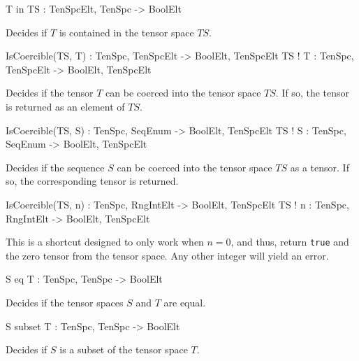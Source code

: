 \begin{intrinsics}
T in TS : TenSpcElt, TenSpc -> BoolElt
\end{intrinsics}

Decides if $T$ is contained in the tensor space $TS$.

\begin{intrinsics}
IsCoercible(TS, T) : TenSpc, TenSpcElt -> BoolElt, TenSpcElt
TS ! T : TenSpc, TenSpcElt -> BoolElt, TenSpcElt
\end{intrinsics}

Decides if the tensor $T$ can be coerced into the tensor space $TS$. If so, the tensor is returned as an element of $TS$.

\begin{intrinsics}
IsCoercible(TS, S) : TenSpc, SeqEnum -> BoolElt, TenSpcElt
TS ! S : TenSpc, SeqEnum -> BoolElt, TenSpcElt
\end{intrinsics}

Decides if the sequence $S$ can be coerced into the tensor space $TS$ as a tensor. If so, the corresponding tensor is returned. 

\begin{intrinsics}
IsCoercible(TS, n) : TenSpc, RngIntElt -> BoolElt, TenSpcElt
TS ! n : TenSpc, RngIntElt -> BoolElt, TenSpcElt
\end{intrinsics}

This is a shortcut designed to only work when $n=0$, and thus, return {\tt true} and the zero tensor from the tensor space. 
Any other integer will yield an error.

\begin{intrinsics}
S eq T : TenSpc, TenSpc -> BoolElt
\end{intrinsics}

Decides if the tensor spaces $S$ and $T$ are equal.

\begin{intrinsics}
S subset T : TenSpc, TenSpc -> BoolElt
\end{intrinsics}

Decides if $S$ is a subset of the tensor space $T$.

